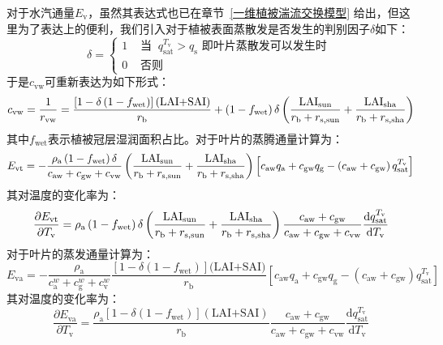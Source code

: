 对于水汽通量$E_{\mathrm{v}}$，虽然其表达式也已在章节~\ref{一维植被湍流交换模型} 给出，但这里为了表达上的便利，我们引入对于植被表面蒸散发是否发生的判别因子$\delta$如下：
\begin{equation}
  \label{delta_cal}
  \delta=
  \begin{cases}
    1 & \text { 当 }\ q_{\mathrm{s a t}}^{T_{\mathrm{v}}}>q_{\mathrm{s}} \text { 即叶片蒸散发可以发生时 } \\
    0 & \text { 否则 }
  \end{cases}
\end{equation}
于是$c_{\mathrm{vw}}$可重新表达为如下形式：
\begin{equation}
  c_{\mathrm{vw}}=\frac{1}{r_{\mathrm{vw}}}=\frac{\left[1-\delta\left(1-f_{\mathrm{wet}}\right)\right](\text{LAI+SAI})}{r_{\mathrm{b}}}+\left( 1 - f_{\mathrm{wet}} \right)\delta\left( \frac{\rm LAI_{\mathrm{sun}}}{r_{\mathrm{b}} + r_{\mathrm{s,\rm sun}}} + \frac{\rm LAI_{\mathrm{sha}}}{r_{\mathrm{b}} + r_{\mathrm{s,\rm sha}}} \right)
\end{equation}
其中$f_{\mathrm{wet}}$表示植被冠层湿润面积占比。对于叶片的蒸腾通量计算为：
\begin{equation}
  E_{\mathrm{vt}} = -\frac{\rho_{\mathrm{a}}\left(1-f_{\mathrm{w e t}}\right)\delta }{c_{\mathrm{aw}}+c_{\mathrm{gw}}+c_{\mathrm{vw}}}\left( \frac{\rm LAI_{\mathrm{sun}}}{r_{\mathrm{b}} + r_{\mathrm{s,\rm sun}}} + \frac{\rm LAI_{\mathrm{sha}}}{r_{\mathrm{b}} + r_{\mathrm{s,\rm sha}}} \right) \left[c_{\mathrm{aw}} q_{\mathrm{a}}+c_{\mathrm{gw}} q_{\mathrm{g}}-\left(c_{\mathrm{aw}}+c_{\mathrm{gw}}\right) q_{\mathrm{s a t}}^{T_{\mathrm{v}}}\right]
\end{equation}
其对温度的变化率为：
\begin{equation}
  \frac{\partial E_{\mathrm{vt}}}{\partial T_{\mathrm{v}}} = \rho_{\mathrm{a}} \left(1-f_{\mathrm{w e t}}\right) \delta \left( \frac{\rm LAI_{\mathrm{sun}}}{r_{\mathrm{b}} + r_{\mathrm{s, \rm sun}}} + \frac{\rm LAI_{\mathrm{sha}}}{r_{\mathrm{b}} + r_{\mathrm{s,\rm sha}}} \right)\frac{c_{\mathrm{aw}}+c_{\mathrm{gw}}}{c_{\mathrm{aw}}+c_{\mathrm{gw}}+c_{\mathrm{vw}}} \frac{{\mathrm {d}} q_{\mathrm{s a t}}^{T_{\mathrm{v}}}}{{\mathrm {d}} T_{\mathrm{v}}}
\end{equation}
对于叶片的蒸发通量计算为：
\begin{equation}
  E_{\mathrm{va}} = -\frac{\rho_{\mathrm{a}}}{c_{\mathrm{a}}^{w}+c_{\mathrm{g}}^{w}+c_{\mathrm{v}}^{w}} \frac{\left[1-\delta\left(1-f_{\mathrm{w e t}}\right)\right](\text {LAI+SAI)}}{r_{\mathrm{b}}}\left[c_{\mathrm{aw}} q_{\mathrm{a}}+c_{\mathrm{gw}} q_{\mathrm{g}}-\left(c_{\mathrm{aw}}+c_{\mathrm{gw}}\right) q_{\mathrm{sat}}^{T_{\mathrm{v}}}\right]
\end{equation}
其对温度的变化率为：
\begin{equation}
  \frac{\partial E_{\mathrm{va}}}{\partial T_{\mathrm{v}}} = \frac{\rho_{\mathrm{a}}\left[1-\delta\left(1-f_{\mathrm{w e t}}\right)\right](\text {LAI+SAI})}{r_{\mathrm{b}}} \frac{c_{\mathrm{aw}}+c_{\mathrm{gw}}}{c_{\mathrm{aw}}+c_{\mathrm{gw}}+c_{\mathrm{vw}}} \frac{{\mathrm {d}} q_{\mathrm{s a t}}^{T_{\mathrm{v}}}}{{\mathrm {d}} T_{\mathrm{v}}}
\end{equation}

